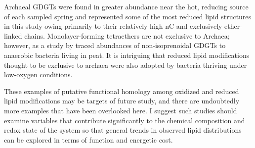 Archaeal GDGTs were found in greater abundance near the hot, reducing source of each sampled spring and represented some of the most reduced lipid structures in this study owing primarily to their relatively high nC and exclusively ether-linked chains. Monolayer-forming tetraethers are not exclusive to Archaea; however, as a study by \cite{} traced abundances of non-isoprenoidal GDGTs to anaerobic bacteria living in peat. It is intriguing that reduced lipid modifications thought to be exclusive to archaea were also adopted by bacteria thriving under low-oxygen conditions.

These examples of putative functional homology among oxidized and reduced lipid modifications may be targets of future study, and there are undoubtedly more examples that have been overlooked here. I suggest such studies should examine variables that contribute significantly to the chemical composition and redox state of the system so that general trends in observed lipid distributions can be explored in terms of function and energetic cost.








